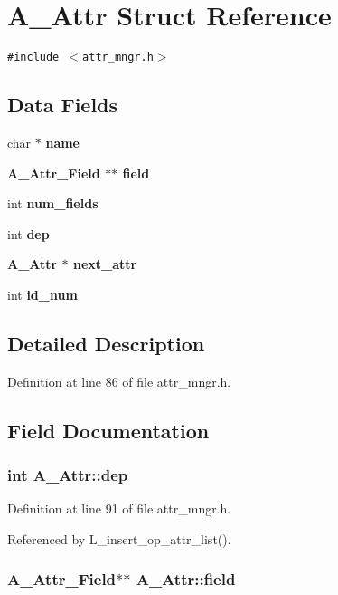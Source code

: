 \section{A\_\-Attr Struct Reference}
\label{structA__Attr}
{\tt \#include $<$attr\_\-mngr.h$>$}

\subsection*{Data Fields}
\begin{CompactItemize}
\item 
char $\ast$ \bf{name}
\item 
\bf{A\_\-Attr\_\-Field} $\ast$$\ast$ \bf{field}
\item 
int \bf{num\_\-fields}
\item 
int \bf{dep}
\item 
\bf{A\_\-Attr} $\ast$ \bf{next\_\-attr}
\item 
int \bf{id\_\-num}
\end{CompactItemize}


\subsection{Detailed Description}




Definition at line 86 of file attr\_\-mngr.h.

\subsection{Field Documentation}
\subsubsection{\setlength{\rightskip}{0pt plus 5cm}int \bf{A\_\-Attr::dep}}\label{structA__Attr_c0b50be0b83883506659e9de9327c369}




Definition at line 91 of file attr\_\-mngr.h.

Referenced by L\_\-insert\_\-op\_\-attr\_\-list().
\subsubsection{\setlength{\rightskip}{0pt plus 5cm}\bf{A\_\-Attr\_\-Field}$\ast$$\ast$ \bf{A\_\-Attr::field}}\label{structA__Attr_60d44a63634ce0a779d7e946347ed4fb}




